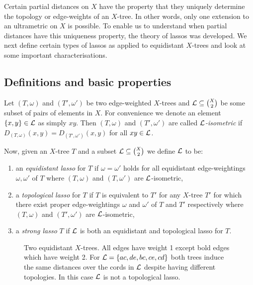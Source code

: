 Certain partial distances on $X$ have the property that they uniquely
determine the topology or edge-weights of an $X$-tree.  In other words, only
one extension to an ultrametric on $X$ is possible.  To enable us to
understand when partial distances have this uniqueness property, the theory of
lassos was developed.  We next define certain types of lassos as applied to
equidistant $X$-trees and look at some important characterisations.

\subsection{Definitions and basic properties}
\label{sec:defin-basic-prop}

Let $(T,\omega)$ and $(T',\omega')$ be two edge-weighted $X$-trees and ${\mathcal L}
\subseteq {X \choose 2}$ be some subset of pairs of elements in $X$.  For
convenience we denote an element $\{x,y\} \in {\mathcal L}$ as simply $xy$.  Then
$(T,\omega)$ and $(T',\omega')$ are called \textit{${\mathcal L}$-isometric} if
$D_{(T,\omega)}(x,y) = D_{(T',\omega')}(x,y)$ for all $xy \in {\mathcal L}$.

Now, given an $X$-tree $T$ and a subset ${\mathcal L} \subseteq {X \choose 2}$ we
define ${\mathcal L}$ to be:
\begin{enumerate}[label=(\roman*)]
\item an \textit{equidistant lasso} for $T$ if $\omega = \omega'$ holds for
  all equidistant edge-weightings $\omega,\omega'$ of $T$ where $(T,\omega)$
  and $(T,\omega')$ are ${\mathcal L}$-isometric,
\item a \textit{topological lasso} for $T$ if $T$ is equivalent to $T'$ for
  any $X$-tree $T'$ for which there exist proper edge-weightings $\omega$ and
  $\omega'$ of $T$ and $T'$ respectively where $(T,\omega)$ and $(T',\omega')$
  are ${\mathcal L}$-isometric,
\item a \textit{strong lasso} $T$ if ${\mathcal L}$ is both an equidistant and
  topological lasso for $T$.
\end{enumerate}

\begin{figure}
\begin{center}

\end{center}
\caption{Two equidistant $X$-trees.  All edges have weight 1 except bold edges
  which have weight 2.  For ${\mathcal L}=\{ac,de,bc,ce,cd\}$ both trees induce the
  same distances over the cords in ${\mathcal L}$ despite having different topologies.
  In this case ${\mathcal L}$ is not a topological lasso.}
\label{fig:lasso-example}
\end{figure}

